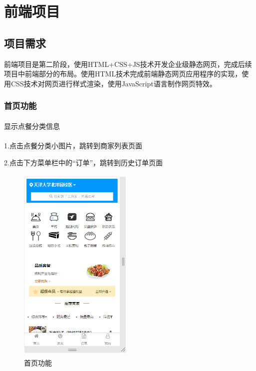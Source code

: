 
\chapter{前端项目}

\section{项目需求}

前端项目是第二阶段，使用HTML+CSS+JS技术开发企业级静态网页，完成后续项目中前端部分的布局。使用HTML技术完成前端静态网页应用程序的实现，使用CSS技术对网页进行样式渲染，使用JavaScript语言制作网页特效。

\subsection{首页功能}
\subsubsection*{}
显示点餐分类信息
\subsubsection*{}
1.点击点餐分类小图片，跳转到商家列表页面

2.点击下方菜单栏中的“订单”，跳转到历史订单页面
\begin{figure}[H]
    \centering
    \includegraphics[width=5.4cm,height=9.6cm]{figures/2.2.1.png}
    \caption{首页功能}
\end{figure}

